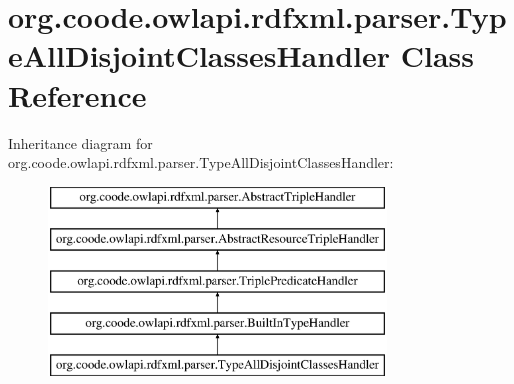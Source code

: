 \hypertarget{classorg_1_1coode_1_1owlapi_1_1rdfxml_1_1parser_1_1_type_all_disjoint_classes_handler}{\section{org.\-coode.\-owlapi.\-rdfxml.\-parser.\-Type\-All\-Disjoint\-Classes\-Handler Class Reference}
\label{classorg_1_1coode_1_1owlapi_1_1rdfxml_1_1parser_1_1_type_all_disjoint_classes_handler}
}
Inheritance diagram for org.\-coode.\-owlapi.\-rdfxml.\-parser.\-Type\-All\-Disjoint\-Classes\-Handler\-:\begin{figure}[H]
\begin{center}
\leavevmode
\includegraphics[height=5.000000cm]{classorg_1_1coode_1_1owlapi_1_1rdfxml_1_1parser_1_1_type_all_disjoint_classes_handler}
\end{center}
\end{figure}
